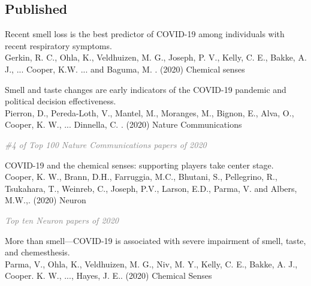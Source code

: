 \documentclass[10pt]{cooperCV2}
\begin{document}
\subsection{Published} 
\begin{etaremune}[resume,itemindent=-1.5\bibhang, topsep=0pt,
				   itemsep=\bibsep,partopsep=0pt,parsep=0pt,leftmargin={\bibhang+\widthof{[999]}}] 
    
    \item Recent smell loss is the best predictor of COVID-19 among individuals with recent respiratory symptoms. \\
     Gerkin, R. C., Ohla, K., Veldhuizen, M. G., Joseph, P. V., Kelly, C. E., Bakke, A. J., ... Cooper, K.W. ... and Baguma, M. . (2020) Chemical senses 
     
	
    \item Smell and taste changes are early indicators of the COVID-19 pandemic and political decision effectiveness. \\
     Pierron, D., Pereda-Loth, V., Mantel, M., Moranges, M., Bignon, E., Alva, O.,  Cooper, K. W., ... Dinnella, C. . (2020) Nature Communications 
     
     	\begin{innerlist}
     	
	     \item  \textcolor{grey}{\textit{\#4 of Top 100 Nature Communications papers of 2020} }
     	
     	\end{innerlist}
     
	
    \item COVID-19 and the chemical senses: supporting players take center stage. \\
     Cooper, K. W., Brann, D.H., Farruggia, M.C., Bhutani, S., Pellegrino, R., Tsukahara, T., Weinreb, C., Joseph, P.V., Larson, E.D., Parma, V. and Albers, M.W.,. (2020) Neuron 
     
     	\begin{innerlist}
     	
	     \item  \textcolor{grey}{\textit{Top ten Neuron papers of 2020} }
     	
     	\end{innerlist}
     
	
    \item More than smell—COVID-19 is associated with severe impairment of smell, taste, and chemesthesis. \\
     Parma, V., Ohla, K., Veldhuizen, M. G., Niv, M. Y., Kelly, C. E., Bakke, A. J., Cooper. K. W., ..., Hayes, J. E.. (2020) Chemical Senses 
     

\end{etaremune}
\end{document}
